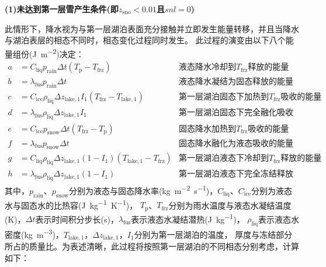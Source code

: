 \noindent\textbf {(1)未达到第一层雪产生条件(即$z_{\mathrm{sno}}<0.01$且$snl=0$)}

此情形下，降水视为与第一层湖泊表面充分接触并立即发生能量转移，并且当降水与湖泊表层的相态不同时，相态变化过程同时发生。
此过程的演变由以下八个能量组份(\unit{J.m^{-2}})决定：
\begin{align*}
  a &= C_{\mathrm{liq}} p_{\mathrm {rain}} \Delta t\left(T_{\mathrm{p}}-T_{\mathrm {frz}}\right)   & \text{液态降水冷却到$T_{\mathrm {frz}} $释放的能量} \\
  b &= \lambda_{\mathrm {fus}}  p_{\mathrm {rain}}  \Delta t                                           & \text{液态降水凝结为固态释放的能量} \\
  c &= C_{\mathrm{ice}} \rho_{\mathrm{liq}} \Delta z_{\mathrm{lake, 1}} I_{1}\left(T_{\mathrm {frz}} -T_{\mathrm{lake, 1}}\right)  & \text{第一层湖泊固态下加热到$T_{\mathrm {frz}} $吸收的能量} \\
  d &= \lambda_{\mathrm {fus}}  \rho_{\mathrm{liq}} \Delta z_{\mathrm{lake, 1}} I_{1}         & \text{第一层湖泊固态下完全融化吸收的能量} \\
  e &= C_{\mathrm{ice}} p_{\mathrm {snow}}  \Delta t\left(T_{\mathrm {frz}}  -T_{\mathrm {p}} \right)        & \text{固态降水加热到$T_{\mathrm {frz}} $吸收的能量} \\
  f &= \lambda_{\mathrm {fus}}  p_{\mathrm {snow}}  \Delta t                                           & \text{固态降水融化为液态吸收的能量} \\
  g &= C_{\mathrm{liq}} \rho_{\mathrm{liq}} \Delta z_{\mathrm{lake, 1}}\left(1-I_{1}\right)\left(T_{\mathrm{lake, 1}}-T_{\mathrm {frz}} \right)  & \text{第一层湖泊液态下冷却到$T_{\mathrm {frz}} $释放的能量} \\
  h &= \lambda_{\mathrm {fus}}  \rho_{\mathrm{liq}} \Delta z_{\mathrm{lake, 1}}\left(1-I_{1}\right)  & \text{第一层湖泊液态下完全冻结释放的能量}
\end{align*}
其中，$p_{\mathrm {rain}} $、$p_{\mathrm {snow}} $分别为液态与固态降水率(\unit{kg.m^{-2}.s^{-1}})，$C_{\mathrm{liq}}$、$C_{\mathrm{ice}}$分别为液态水与固态水的比热容(\unit{J.kg^{-1}.K^{-1}})，
$T_{\mathrm {p}} $、$T_{\mathrm {frz}} $分别为雨水温度与液态水凝结温度(K)，$\Delta t$表示时间积分步长(s)，$\lambda_{\mathrm {fus}} $表示液态水凝结潜热(\unit{J.kg^{-1}})，
$\rho_{\mathrm{liq}}$表示液态水密度(\unit{kg.m^{-3}})，$T_{\mathrm{lake,1}}$，$\Delta z_{\mathrm{lake,1}}$，$I_1$分别为第一层湖泊的温度，
厚度与冻结部分所占的质量比。为表述清晰，此过程将按照第一层湖泊的不同相态分别考虑，计算如下：

